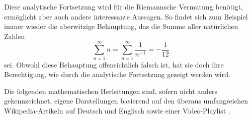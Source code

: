 Diese analytische Fortsetzung wird für die Riemannsche Vermutung benötigt, ermöglicht aber auch andere interessante Aussagen.
So findet sich zum Beispiel immer wieder die aberwitzige Behauptung, das die Summe aller natürlichen Zahlen
%
\begin{equation*}
    \sum_{n=1}^{\infty} n
    =
    \sum_{n=1}^{\infty}
    \frac{1}{n^{-1}}
    =
    -\frac{1}{12}
\end{equation*}
sei.
Obwohl diese Behauptung offensichtlich falsch ist, hat sie doch ihre Berechtigung, wie durch die analytische Fortsetzung gezeigt werden wird.

Die folgenden mathematischen Herleitungen sind, sofern nicht anders gekennzeichnet, eigene Darstellungen basierend auf den überaus umfangreichen Wikipedia-Artikeln auf Deutsch \cite{zeta:online:wiki_de} und Englisch \cite{zeta:online:wiki_en} sowie einer Video-Playlist \cite{zeta:online:mryoumath}.
